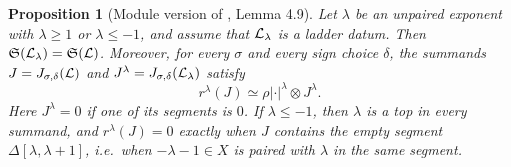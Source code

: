 \documentclass[a4paper,12pt,leqno]{amsart}
\theoremstyle{plain}
\newtheorem{prop}[thm]{Proposition}
\theoremstyle{definition}
\providecommand{\frS}{\mathfrak{S}}\providecommand{\frs}{\mathfrak{s}}
\begin{document}
\begin{prop}[Module version of \cite{Ato24}, Lemma 4.9]\label{prop:cat49} Let $\lambda$ be an
unpaired exponent with $\lambda\geq1$ or $\lambda\leq-1$, and assume that $\mathcal{L}_\lambda$ is a ladder
datum. Then $\frS(\caL_\lambda)=\frS(\caL)$. Moreover, for every $\sigma$ and every sign choice $\delta$,
the summands $J=J_{\sigma,\delta}(\mathcal{L})$ and $J^\lambda=J_{\sigma,\delta}(\mathcal{L}_\lambda)$ satisfy
\[r^\lambda(J)\simeq\rho|\cdot|^\lambda\otimes J^\lambda.\]
Here $J^\lambda=0$ if one of its segments is $0$. If $\lambda\leq-1$, then $\lambda$ is a top in every
summand, and $r^\lambda(J)=0$ exactly when $J$ contains the empty segment $\Delta[\lambda,\lambda+1]$,
i.e.\ when $-\lambda-1\in X$ is paired with $\lambda$ in the same segment.
\end{prop}
\end{document}
